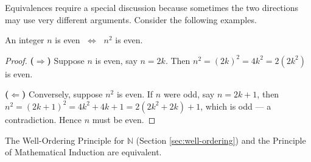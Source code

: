 Equivalences require a special discussion because sometimes the two directions may use very different arguments. Consider the following examples.


\begin{theorem}
An integer $n$ is even $\;\Longleftrightarrow\;$ $n^2$ is even.
\end{theorem}
\begin{proof}
\textbf{($\Rightarrow$)} Suppose $n$ is even, say $n=2k$. Then
$n^2=(2k)^2=4k^2=2(2k^2)$ is even.

\textbf{($\Leftarrow$)} Conversely, suppose $n^2$ is even. If $n$ were odd,
say $n=2k+1$, then $n^2=(2k+1)^2=4k^2+4k+1=2(2k^2+2k)+1$, which is odd —
a contradiction. Hence $n$ must be even.
\end{proof}


\begin{theorem}
The Well-Ordering Principle for $\mathbb N$ (Section \ref{sec:well-ordering})  and the Principle of Mathematical Induction 
 are equivalent.
\end{theorem}

